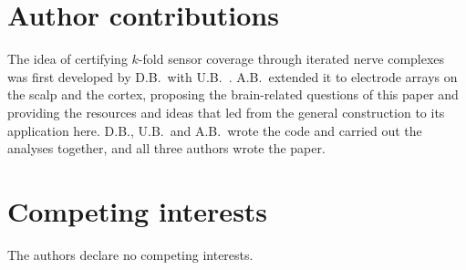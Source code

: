 \documentclass[11pt]{amsart}
\theoremstyle{definition}
\theoremstyle{remark}
\begin{document}
\section*{Author contributions}
The idea of certifying $k$-fold sensor coverage through iterated nerve
complexes was first developed by D.B.\ with U.B.~\cite{BhattacharjeeBhattacharya2026}.
A.B.\ extended it to electrode arrays on the scalp and the cortex, proposing
the brain-related questions of this paper and providing the resources and
ideas that led from the general construction to its application here. D.B.,
U.B.\ and A.B.\ wrote the code and carried out the analyses together, and all
three authors wrote the paper.

\section*{Competing interests}
The authors declare no competing interests.



\end{document}
